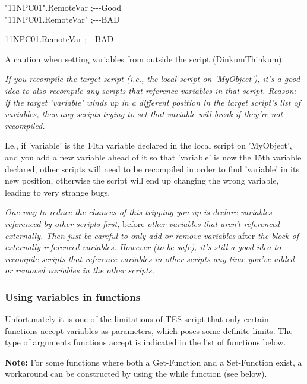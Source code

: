 \documentclass[
]{article}
\begin{document}
"11NPC01".RemoteVar ;-\/-\/-Good\\
"11NPC01.RemoteVar" ;-\/-\/-BAD

11NPC01.RemoteVar ;-\/-\/-BAD

A caution when setting variables from outside the script
(DinkumThinkum):

\emph{If you recompile the target script (i.e., the local script on
'MyObject'), it's a good idea to also recompile any scripts that
reference variables in that script. Reason: if the target 'variable'
winds up in a different position in the target script's list of
variables, then any scripts trying to set that variable will break if
they're not recompiled.}

I.e., if 'variable' is the 14th variable declared in the local script on
'MyObject', and you add a new variable ahead of it so that 'variable' is
now the 15th variable declared, other scripts will need to be recompiled
in order to find 'variable' in its new position, otherwise the script
will end up changing the wrong variable, leading to very strange bugs.

\emph{One way to reduce the chances of this tripping you up is declare
variables referenced by other scripts first,} before \emph{other
variables that aren't referenced externally. Then just be careful to
only add or remove variables} after \emph{the block of externally
referenced variables. However (to be safe), it's still a good idea to
recompile scripts that reference variables in other scripts any time
you've added or removed variables in the other scripts.}

\hypertarget{using-variables-in-functions}{%
\subsubsection{Using variables in
functions}\label{using-variables-in-functions}}

Unfortunately it is one of the limitations of TES script that only
certain functions accept variables as parameters, which poses some
definite limits. The type of arguments functions accept is indicated in
the list of functions below.

\textbf{Note:} For some functions where both a Get-Function and a
Set-Function exist, a workaround can be constructed by using the while
function (see below).

\hypertarget{section}{%
\subsubsection{}\label{section}}
\end{document}
